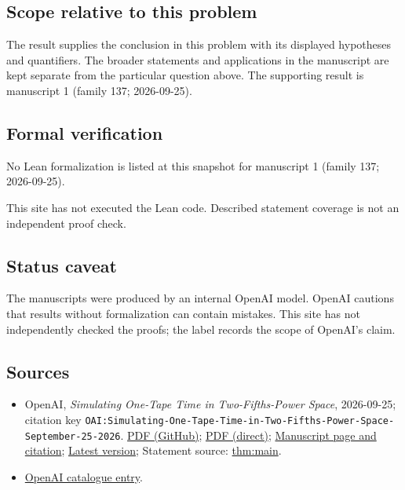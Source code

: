\documentclass[11pt]{article}
\begin{document}
\subsection{Scope relative to this problem}
The result supplies the conclusion in this problem with its displayed hypotheses and quantifiers. The broader statements and applications in the manuscript are kept separate from the particular question above. The supporting result is manuscript 1 (family 137; 2026-09-25).

\subsection{Formal verification}
No Lean formalization is listed at this snapshot for manuscript 1 (family 137; 2026-09-25).

This site has not executed the Lean code. Described statement coverage is not an independent proof check.

\subsection{Status caveat}
The manuscripts were produced by an internal OpenAI model. OpenAI cautions that results without formalization can contain mistakes. This site has not independently checked the proofs; the label records the scope of OpenAI's claim.

\subsection{Sources}
\begin{itemize}
\item OpenAI, \emph{Simulating One-Tape Time in Two-Fifths-Power Space}, 2026-09-25; citation key \texttt{OAI:Simulating-One-Tape-Time-in-Two-Fifths-Power-Space-September-25-2026}. \href{https://github.com/openai/math/blob/adc7f1241b42e322a6451854ab7e4b4c146bf78a/preprints/Simulating-One-Tape-Time-in-Two-Fifths-Power-Space-September-25-2026/article.pdf}{PDF (GitHub)}; \href{https://github.com/openai/math/raw/adc7f1241b42e322a6451854ab7e4b4c146bf78a/preprints/Simulating-One-Tape-Time-in-Two-Fifths-Power-Space-September-25-2026/article.pdf}{PDF (direct)}; \href{https://github.com/openai/math/blob/adc7f1241b42e322a6451854ab7e4b4c146bf78a/preprints/Simulating-One-Tape-Time-in-Two-Fifths-Power-Space-September-25-2026/README.md}{Manuscript page and citation}; \href{https://github.com/openai/math/blob/main/preprints/Simulating-One-Tape-Time-in-Two-Fifths-Power-Space-September-25-2026/article.pdf}{Latest version}; Statement source: \href{https://github.com/openai/math/blob/adc7f1241b42e322a6451854ab7e4b4c146bf78a/preprints/Simulating-One-Tape-Time-in-Two-Fifths-Power-Space-September-25-2026/build/source/sections/introduction.tex\#L64}{thm:main}.
\item \href{https://github.com/openai/math/blob/adc7f1241b42e322a6451854ab7e4b4c146bf78a/CONTENTS.md}{OpenAI catalogue entry}.
\end{itemize}
\end{document}
